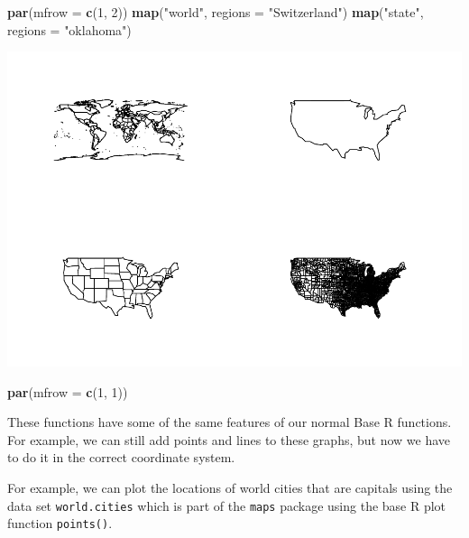 \documentclass[
]{book}
\newenvironment{Shaded}{\begin{snugshade}}{\end{snugshade}}
\newcommand{\DataTypeTok}[1]{\textcolor[rgb]{0.13,0.29,0.53}{#1}}
\newcommand{\DecValTok}[1]{\textcolor[rgb]{0.00,0.00,0.81}{#1}}
\newcommand{\KeywordTok}[1]{\textcolor[rgb]{0.13,0.29,0.53}{\textbf{#1}}}
\newcommand{\NormalTok}[1]{#1}
\newcommand{\OperatorTok}[1]{\textcolor[rgb]{0.81,0.36,0.00}{\textbf{#1}}}
\newcommand{\StringTok}[1]{\textcolor[rgb]{0.31,0.60,0.02}{#1}}
\begin{document}
\begin{Shaded}
\begin{Highlighting}[]
\KeywordTok{par}\NormalTok{(}\DataTypeTok{mfrow =} \KeywordTok{c}\NormalTok{(}\DecValTok{1}\NormalTok{, }\DecValTok{2}\NormalTok{))}
\KeywordTok{map}\NormalTok{(}\StringTok{"world"}\NormalTok{, }\DataTypeTok{regions =} \StringTok{"Switzerland"}\NormalTok{)}
\KeywordTok{map}\NormalTok{(}\StringTok{"state"}\NormalTok{, }\DataTypeTok{regions =} \StringTok{"oklahoma"}\NormalTok{)}
\end{Highlighting}
\end{Shaded}

\includegraphics{_main_files/figure-latex/unnamed-chunk-195-1.pdf}

\begin{Shaded}
\begin{Highlighting}[]
\KeywordTok{par}\NormalTok{(}\DataTypeTok{mfrow =} \KeywordTok{c}\NormalTok{(}\DecValTok{1}\NormalTok{, }\DecValTok{1}\NormalTok{))}
\end{Highlighting}
\end{Shaded}

These functions have some of the same features of our normal Base R functions. For example, we can still add points and lines to these graphs, but now we have to do it in the correct coordinate system.

For example, we can plot the locations of world cities that are capitals using the data set \texttt{world.cities} which is part of the \texttt{maps} package using the base R plot function \texttt{points()}.

\begin{Shaded}
\end{Shaded}
\end{document}
